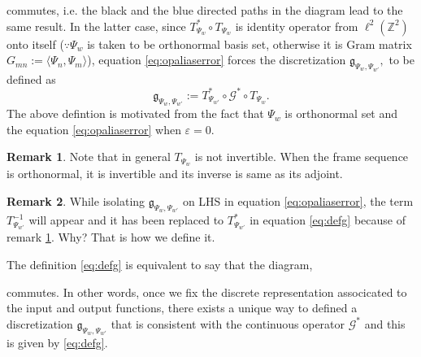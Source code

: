 \documentclass[reqno,10pt]{amsart}
\theoremstyle{plain}
\theoremstyle{definition}
\newtheorem{rem}{Remark}
\newcommand{\bb}[1]{\mathbb{#1}}
\newcommand{\cal}[1]{\mathcal{#1}}
\begin{document}
    \noindent commutes, i.e. the black and the blue directed paths in the diagram lead to the same result. In the latter case, since $T^*_{\Psi_w} \circ T_{\Psi_w}$ is identity operator from $\ell^2(\bb Z^2)$ onto itself ($\because \Psi_w$ is taken to be orthonormal basis set, otherwise it is Gram matrix $G_{mn} := \langle \Psi_n,\Psi_m\rangle$), equation \ref{eq:opaliaserror} forces the discretization $\mathfrak{g}_{\Psi_w,\Psi_{w'}},$ to be defined as
    \begin{equation}\label{eq:defg}
        \mathfrak{g}_{\Psi_w,\Psi_{w'}} := T^*_{\Psi_{w'}} \circ \cal G^* \circ T_{\Psi_w}.
    \end{equation}
    The above defintion is motivated from the fact that $\Psi_w$ is orthonormal set and the equation \ref{eq:opaliaserror} when $\varepsilon = 0$.
    \begin{rem}\label{rem:invert}
        Note that in general $T_{\Psi_w}$ is not invertible. When the frame sequence is orthonormal, it is invertible and its inverse is same as its adjoint.
    \end{rem}
    \begin{rem}
        While isolating $\mathfrak{g}_{\Psi_w,\Psi_{w'}}$ on LHS in equation \ref{eq:opaliaserror}, the term $T^{-1}_{\Psi_{w'}}$ will appear and it has been replaced to $T^*_{\Psi_{w'}}$ in equation \ref{eq:defg} because of remark \ref{rem:invert}. Why? That is how we define it. 
    \end{rem}
    \noindent The definition \ref{eq:defg} is equivalent to say that the diagram,
    \begin{figure}[!ht]
        \caption{}
    \end{figure}
    commutes. In other words, once we fix the discrete representation associcated to the input and output functions, there exists a unique way to defined a discretization $\mathfrak{g}_{\Psi_w,\Psi_{w'}}$ that is consistent with the continuous operator $\cal G^*$ and this is given by \ref{eq:defg}.
\end{document}
